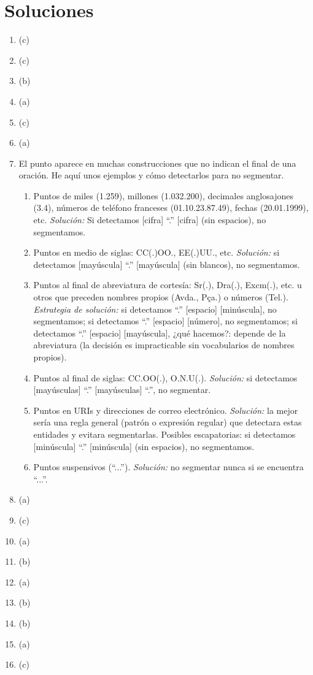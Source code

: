 \section{Soluciones} \begin{enumerate} \item (c) \item (c) \item (b) \item (a) \item (c) \item (a) \item El punto aparece en muchas construcciones que no indican el final de una oración. He aquí unos ejemplos y cómo detectarlos para no segmentar. \begin{enumerate} \item Puntos de miles (1.259), millones (1.032.200), decimales anglosajones (3.4), números de teléfono franceses (01.10.23.87.49), fechas (20.01.1999), etc. \emph{Solución:} Si detectamos [cifra] ``.'' [cifra] (sin espacios), no segmentamos. 

\item Puntos en medio de siglas: CC(.)OO., EE(.)UU., etc. \emph{Solución:} si detectamos [mayúscula] ``.'' [mayúscula] (sin blancos), no segmentamos. 

\item Puntos al final de abreviatura de cortesía: Sr(.), Dra(.), Excm(.), etc. u otros que preceden nombres propios (Avda., Pça.) o números (Tel.). \emph{Estrategia de solución:} si detectamos ``.'' [espacio] [minúscula], no segmentamos; si detectamos ``.'' [espacio] [número], no segmentamos; si detectamos ``.'' [espacio] [mayúscula], ¿qué hacemos?: depende de la abreviatura (la decisión es impracticable sin vocabularios de nombres propios). 

\item Puntos al final de siglas: CC.OO(.), O.N.U(.). \emph{Solución:} si detectamos [mayúsculas] ``.'' [mayúsculas] ``.'', no segmentar. 

\item Puntos en URIs y direcciones de correo electrónico. \emph{Solución:} la mejor sería una regla general (patrón o expresión regular) que detectara estas entidades y evitara segmentarlas. Posibles escapatorias: si detectamos [minúscula] ``.'' [minúscula] (sin espacios), no segmentamos. 

\item Puntos suspensivos (``...''). \emph{Solución:} no segmentar nunca si se encuentra ``...''. \end{enumerate} 

\item (a) \item (c) \item (a) \item (b) \item (a) \item (b) \item (b) \item (a) \item (c) 

\end{enumerate} 

